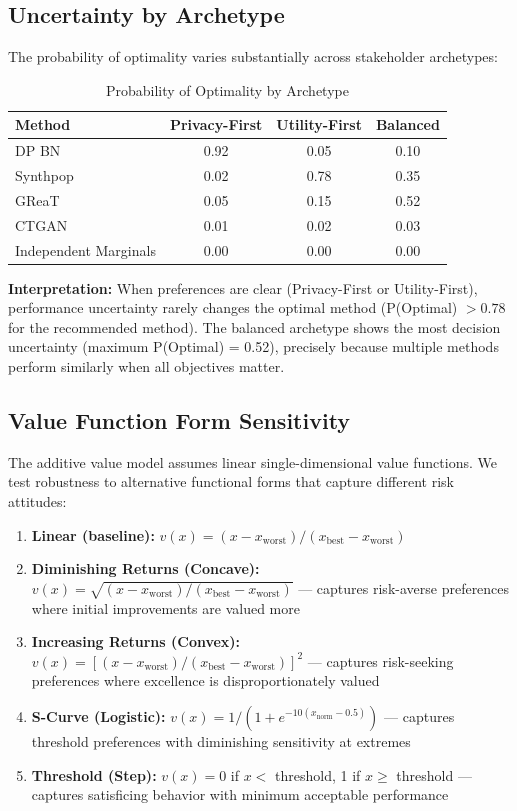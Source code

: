 \documentclass[12pt,a4paper]{article}
\begin{document}
\subsection{Uncertainty by Archetype}

The probability of optimality varies substantially across stakeholder archetypes:

\begin{table}[htbp]
\centering
\caption{Probability of Optimality by Archetype}
\begin{tabular}{@{}lccc@{}}
\toprule
\textbf{Method} & \textbf{Privacy-First} & \textbf{Utility-First} & \textbf{Balanced} \\
\midrule
DP BN & 0.92 & 0.05 & 0.10 \\
Synthpop & 0.02 & 0.78 & 0.35 \\
GReaT & 0.05 & 0.15 & 0.52 \\
CTGAN & 0.01 & 0.02 & 0.03 \\
Independent Marginals & 0.00 & 0.00 & 0.00 \\
\bottomrule
\end{tabular}
\end{table}

\textbf{Interpretation:} When preferences are clear (Privacy-First or Utility-First), performance uncertainty rarely changes the optimal method (P(Optimal) $> 0.78$ for the recommended method). The balanced archetype shows the most decision uncertainty (maximum P(Optimal) = 0.52), precisely because multiple methods perform similarly when all objectives matter.

\subsection{Value Function Form Sensitivity}

The additive value model assumes linear single-dimensional value functions. We test robustness to alternative functional forms that capture different risk attitudes:

\begin{enumerate}
    \item \textbf{Linear (baseline):} $v(x) = (x - x_{\text{worst}})/(x_{\text{best}} - x_{\text{worst}})$
    \item \textbf{Diminishing Returns (Concave):} $v(x) = \sqrt{(x - x_{\text{worst}})/(x_{\text{best}} - x_{\text{worst}})}$ --- captures risk-averse preferences where initial improvements are valued more
    \item \textbf{Increasing Returns (Convex):} $v(x) = [(x - x_{\text{worst}})/(x_{\text{best}} - x_{\text{worst}})]^2$ --- captures risk-seeking preferences where excellence is disproportionately valued
    \item \textbf{S-Curve (Logistic):} $v(x) = 1/(1 + e^{-10(x_{\text{norm}} - 0.5)})$ --- captures threshold preferences with diminishing sensitivity at extremes
    \item \textbf{Threshold (Step):} $v(x) = 0$ if $x < $ threshold, 1 if $x \geq$ threshold --- captures satisficing behavior with minimum acceptable performance
\end{enumerate}
\end{document}
